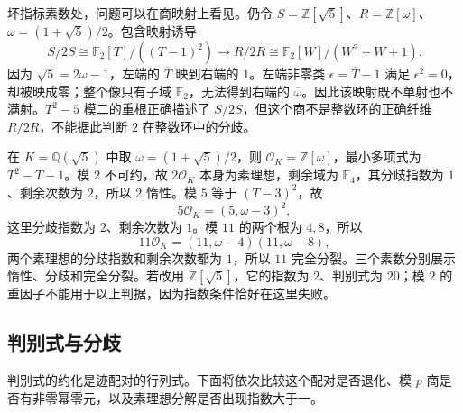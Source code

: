 坏指标素数处，问题可以在商映射上看见。仍令 \(S=\mathbb Z[\sqrt5]\)、\(R=\mathbb Z[\omega]\)、\(\omega=(1+\sqrt5)/2\)。包含映射诱导
\[
	S/2S\cong\mathbb F_2[T]/((T-1)^2) \longrightarrow R/2R\cong\mathbb F_2[W]/(W^2+W+1).
\]
因为 \(\sqrt5=2\omega-1\)，左端的 \(\overline T\) 映到右端的 \(1\)。左端非零类 \(\epsilon=\overline T-1\) 满足 \(\epsilon^2=0\)，却被映成零；整个像只有子域 \(\mathbb F_2\)，无法得到右端的 \(\overline\omega\)。因此该映射既不单射也不满射。\(T^2-5\) 模二的重根正确描述了 \(S/2S\)，但这个商不是整数环的正确纤维 \(R/2R\)，不能据此判断 \(2\) 在整数环中的分歧。

\begin{example}\label{b3:exm:quadratic-five-splitting}
	在 \(K=\mathbb Q(\sqrt5)\) 中取 \(\omega=(1+\sqrt5)/2\)，则 \(\mathcal O_K=\mathbb Z[\omega]\)，最小多项式为 \(T^2-T-1\)。模 \(2\) 不可约，故 \(2\mathcal O_K\) 本身为素理想，剩余域为 \(\mathbb F_4\)，其分歧指数为 \(1\)、剩余次数为 \(2\)，所以 \(2\) 惰性。模 \(5\) 等于 \((T-3)^2\)，故
	\[
		5\mathcal O_K=(5,\omega-3)^2,
	\]
	这里分歧指数为 \(2\)、剩余次数为 \(1\)。模 \(11\) 的两个根为 \(4,8\)，所以
	\[
		11\mathcal O_K=(11,\omega-4)(11,\omega-8),
	\]
	两个素理想的分歧指数和剩余次数都为 \(1\)，所以 \(11\) 完全分裂。三个素数分别展示惰性、分歧和完全分裂。若改用 \(\mathbb Z[\sqrt5]\)，它的指数为 \(2\)、判别式为 \(20\)；模 \(2\) 的重因子不能用于以上判据，因为指数条件恰好在这里失败。
\end{example}

\subsection{判别式与分歧}
\label{b3:subsec:A02:04}

判别式的约化是迹配对的行列式。下面将依次比较这个配对是否退化、模 \(p\) 商是否有非零幂零元，以及素理想分解是否出现指数大于一。

